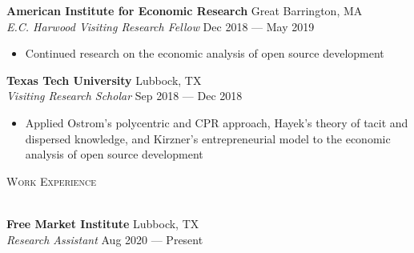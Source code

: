 \documentclass[a4paper]{article}
\newcommand{\lineunder} {
    \vspace*{-8pt} \\
    \hspace*{-18pt} \hrulefill \\
}
\newcommand{\header} [1] {
    {\hspace*{-18pt}\vspace*{6pt} \textsc{\large{#1}}}
    \vspace*{-6pt} \lineunder
}
\begin{document}
\textbf{American Institute for Economic Research} \hfill Great Barrington, MA\\
\textit{E.C. Harwood Visiting Research Fellow} \hfill Dec 2018 --- May 2019\\
\begin{itemize}[noitemsep,nolistsep]
	\item Continued research on the economic analysis of open source development
\end{itemize}
\vspace{1mm}
\textbf{Texas Tech University} \hfill Lubbock, TX\\
\textit{Visiting Research Scholar} \hfill Sep 2018 --- Dec 2018\\
\begin{itemize}[noitemsep,nolistsep]
	\item Applied Ostrom's polycentric and CPR approach, Hayek's theory of tacit and dispersed knowledge, and Kirzner's entrepreneurial model to the economic analysis of open source development
\end{itemize}
\vspace{2mm}

\header{Work Experience}
\vspace{1mm}

\textbf{Free Market Institute} \hfill Lubbock, TX\\
\textit{Research Assistant} \hfill Aug 2020 --- Present \\
\vspace{1mm}
\end{document}
